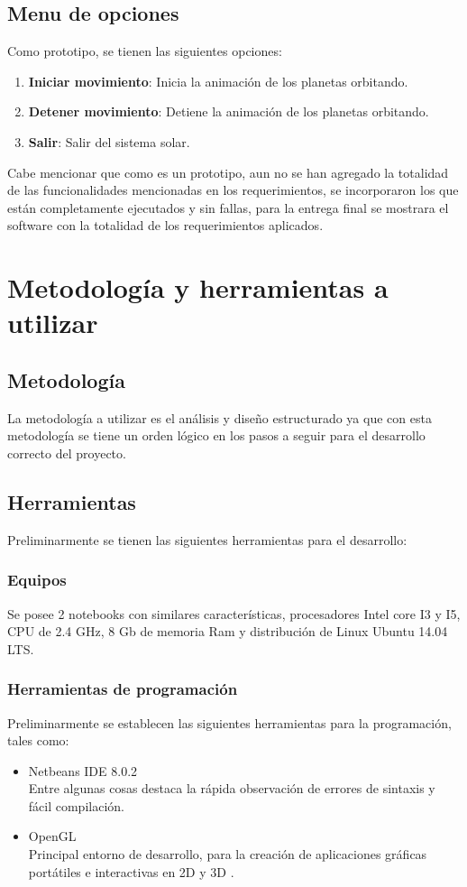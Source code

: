 \documentclass[12pt,journal,compsoc]{IEEEtran}
\begin{document}
\subsection{Menu de opciones}

Como prototipo, se tienen las siguientes opciones:

\begin{enumerate}
	\item \textbf{Iniciar movimiento}: Inicia la animación de los planetas orbitando.
	\item \textbf{Detener movimiento}: Detiene la animación de los planetas orbitando.
	\item \textbf{Salir}: Salir del sistema solar.
\end{enumerate}
Cabe mencionar que como es un prototipo, aun no se han agregado la totalidad de las funcionalidades mencionadas en los requerimientos, se incorporaron los que están completamente ejecutados y sin fallas, para la entrega final se mostrara el software con la totalidad de los requerimientos aplicados.
\section{Metodología y herramientas a utilizar}
\subsection{Metodología}
La metodología a utilizar es el análisis y diseño estructurado ya que con esta metodología se tiene un orden lógico en los pasos a seguir para el desarrollo correcto del proyecto.
\subsection{Herramientas}
Preliminarmente se tienen las siguientes herramientas para el desarrollo:
\subsubsection{Equipos}
Se posee 2 notebooks con similares características, procesadores Intel core I3 y I5, CPU de 2.4 GHz, 8 Gb de memoria Ram y distribución de Linux Ubuntu 14.04 LTS.
\subsubsection{Herramientas de programación}
Preliminarmente se establecen las siguientes herramientas para la programación, tales como:
\begin{itemize}
 \item Netbeans IDE 8.0.2\\
 	Entre algunas cosas destaca la rápida observación de errores de sintaxis y fácil compilación.
 \item OpenGL\\
 	Principal entorno de desarrollo, para la creación de aplicaciones gráficas portátiles e interactivas en
 	2D y 3D \cite{opengl}.
\end{itemize}
\end{document}
